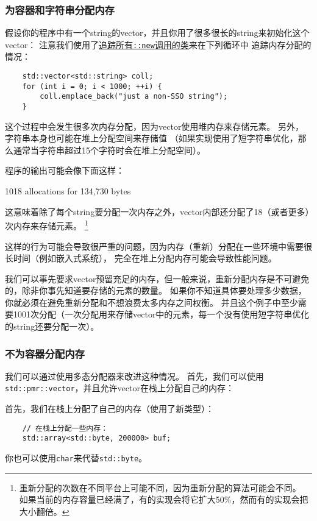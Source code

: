 \subsubsection{为容器和字符串分配内存}\label{ch29.1.1.1}
假设你的程序中有一个string的vector，并且你用了很多很长的string来初始化这个vector：
注意我们使用了\hyperref[ch30.4]{追踪所有\texttt{::new}调用的类}来在下列循环中
追踪内存分配的情况：
\begin{lstlisting}
    std::vector<std::string> coll;
    for (int i = 0; i < 1000; ++i) {
        coll.emplace_back("just a non-SSO string");
    }
\end{lstlisting}
这个过程中会发生很多次内存分配，因为vector使用堆内存来存储元素。
另外，字符串本身也可能在堆上分配空间来存储值
（如果实现使用了短字符串优化，那么通常当字符串超过15个字符时会在堆上分配空间）。

程序的输出可能会像下面这样：
\begin{blacklisting}
    1018 allocations for 134,730 bytes
\end{blacklisting}
这意味着除了每个string要分配一次内存之外，vector内部还分配了18（或者更多）次内存来存储元素。
\footnote{重新分配的次数在不同平台上可能不同，因为重新分配的算法可能会不同。
如果当前的内存容量已经满了，有的实现会将它扩大50\%，然而有的实现会把大小翻倍。}

这样的行为可能会导致很严重的问题，因为内存（重新）分配在一些环境中需要很长时间（例如嵌入式系统），
完全在堆上分配内存可能会导致性能问题。

我们可以事先要求vector预留充足的内存，但一般来说，重新分配内存是不可避免的，除非你事先知道要存储的元素的数量。
如果你不知道具体要处理多少数据，你就必须在避免重新分配和不想浪费太多内存之间权衡。
并且这个例子中至少需要1001次分配（一次分配用来存储vector中的元素，每一个没有使用短字符串优化的string还要分配一次）。

\subsubsection{不为容器分配内存}
我们可以通过使用多态分配器来改进这种情况。
首先，我们可以使用\texttt{std::pmr::vector}，并且允许vector在栈上分配自己的内存：

首先，我们在栈上分配了自己的内存（使用了新类型）：
\begin{lstlisting}
    // 在栈上分配一些内存：
    std::array<std::byte, 200000> buf;
\end{lstlisting}
你也可以使用\texttt{char}来代替\texttt{std::byte}。


